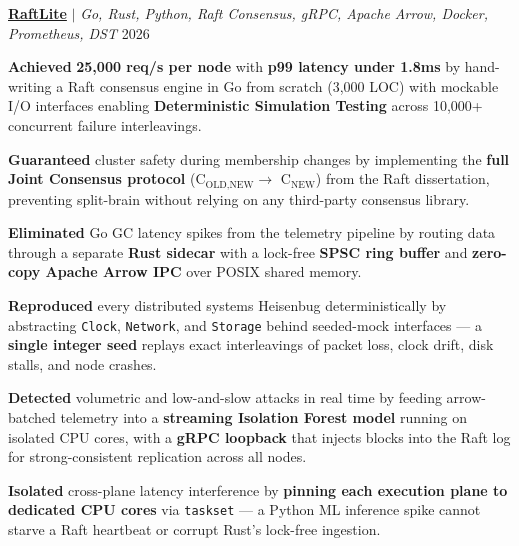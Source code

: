 \resumeProject
      {\textbf{\href{https://github.com/yourusername/raftlite}
{RaftLite}} $|$ \emph{Go, Rust, Python, Raft Consensus, gRPC, Apache Arrow, Docker, Prometheus, DST}}{}      {2026}

      \resumeItemListStart
        \item{\textbf{Achieved} \textbf{25,000 req/s per node} with \textbf{p99 latency under 1.8ms} by hand-writing a Raft consensus engine in Go from scratch (3,000 LOC) with mockable I/O interfaces enabling \textbf{Deterministic Simulation Testing} across 10,000+ concurrent failure interleavings.}
        \item{\textbf{Guaranteed} cluster safety during membership changes by implementing the \textbf{full Joint Consensus protocol} (C$_{\text{OLD,NEW}} \to$ C$_{\text{NEW}}$) from the Raft dissertation, preventing split-brain without relying on any third-party consensus library.}
        \item{\textbf{Eliminated} Go GC latency spikes from the telemetry pipeline by routing data through a separate \textbf{Rust sidecar} with a lock-free \textbf{SPSC ring buffer} and \textbf{zero-copy Apache Arrow IPC} over POSIX shared memory.}
        \item{\textbf{Reproduced} every distributed systems Heisenbug deterministically by abstracting \texttt{Clock}, \texttt{Network}, and \texttt{Storage} behind seeded-mock interfaces — a \textbf{single integer seed} replays exact interleavings of packet loss, clock drift, disk stalls, and node crashes.}
        \item{\textbf{Detected} volumetric and low-and-slow attacks in real time by feeding arrow-batched telemetry into a \textbf{streaming Isolation Forest model} running on isolated CPU cores, with a \textbf{gRPC loopback} that injects blocks into the Raft log for strong-consistent replication across all nodes.}
        \item{\textbf{Isolated} cross-plane latency interference by \textbf{pinning each execution plane to dedicated CPU cores} via \texttt{taskset} — a Python ML inference spike cannot starve a Raft heartbeat or corrupt Rust's lock-free ingestion.}
      \resumeItemListEnd
